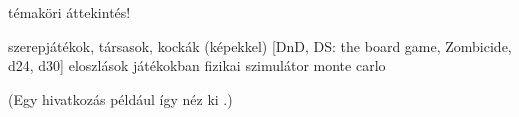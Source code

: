 
témaköri áttekintés!

szerepjátékok, társasok, kockák (képekkel) [DnD, DS: the board game, Zombicide, d24, d30]
eloszlások játékokban
fizikai szimulátor
monte carlo

(Egy hivatkozás például így néz ki \cite{coombs1987markup}.)
